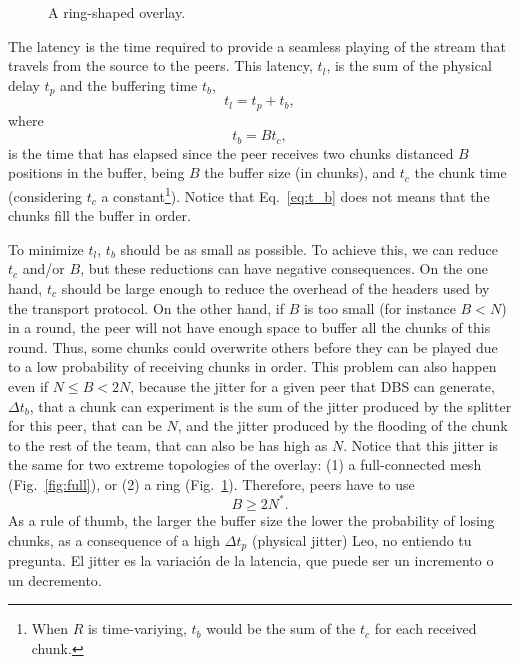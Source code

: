 

\label{sec:latency}

\begin{figure}
  \centering
  \vbox{}
  \caption{A ring-shaped overlay.}
  \label{fig:ring}
\end{figure}

The latency is the time required to provide a seamless playing of
the stream that travels from the source to the peers. This latency,
$t_l$, is the sum of the physical delay $t_p$ and the buffering time
$t_b$,
\begin{equation}
  \label{eq:t_l}
  t_l = t_p + t_b,
\end{equation}
where
\begin{equation}
  \label{eq:t_b}
  t_b = Bt_c,
\end{equation}
is the time that has elapsed since the peer receives two chunks
distanced $B$ positions in the buffer, being $B$ the buffer
size (in chunks), and $t_c$ the chunk time (considering $t_c$ a
constant\footnote{When $R$ is time-variying, $t_b$ would be the sum of
  the $t_c$ for each received chunk.}). Notice that Eq.~\ref{eq:t_b}
does not means that the chunks fill the buffer in order.

To minimize $t_l$, $t_b$ should be as small as possible. To achieve
this, we can reduce $t_c$ and/or $B$, but these reductions can have
negative consequences. On the one hand, $t_c$ should be large enough
to reduce the overhead of the headers used by the transport
protocol. On the other hand, if $B$ is too small (for instance $B<N$)
in a round, the peer will not have enough space to buffer all the
chunks of this round. Thus, some chunks could overwrite others before
they can be played due to a low probability of receiving chunks in
order. This problem can also happen even if $N\leq B<2N$, because the
jitter for a given peer that DBS can generate, $\Delta t_b$, that a
chunk can experiment is the sum of the jitter produced by the splitter
for this peer, that can be $N$, and the jitter produced by the
flooding of the chunk to the rest of the team, that can also be has
high as $N$. Notice that this jitter is the same for two extreme
topologies of the overlay: (1) a full-connected mesh
(Fig.~\ref{fig:full}), or (2) a ring
(Fig.~\ref{fig:ring}). Therefore, peers have to use
\begin{equation}
  \label{eq:minimum_B}
  B\ge 2N^*.
\end{equation}
As a rule of thumb, the larger the buffer size the lower the
probability of losing chunks, as a consequence of a high $\Delta t_p$
(physical jitter)  {\color{red}
  Leo, no entiendo tu pregunta. El jitter es la variación de la
  latencia, que puede ser un incremento o un decremento}.

